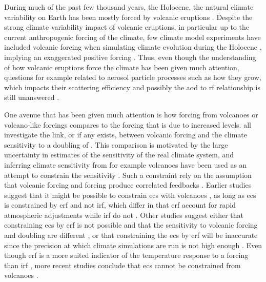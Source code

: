 \documentclass{ametsocV5}
\begin{document}
During much of the past few thousand years, the Holocene, the natural climate
variability on Earth has been mostly forced by volcanic eruptions \citep{sigl2022}.
Despite the strong climate variability impact of volcanic eruptions, in particular up to
the current anthropogenic forcing of the climate, few climate model experiments have
included volcanic forcing when simulating climate evolution during the Holocene
\citep{sigl2022}, implying an exaggerated positive forcing \citep{gregory2016}. Thus,
even though the understanding of how volcanic eruptions force the climate has been given
much attention, questions for example related to aerosol particle processes such as how
they grow, which impacts their scattering efficiency and possibly the \ac{aod} to
\ac{rf} relationship is still unanswered
\citep[e.g.][]{robock2000,zanchettin2019,marshall2020,marshall2022}.




One avenue that has been given much attention is how forcing from volcanoes or
volcano-like forcings compares to the forcing that is due to increased  levels.
\citet{boer2007,marvel2016,merlis2014,ollila2016,richardson2019,salvi2022,wigley2005}
all investigate the link, or if any exists, between volcanic forcing and the climate
sensitivity to a doubling of . This comparison is motivated by the large
uncertainty in estimates of the sensitivity of the real climate system, and inferring
climate sensitivity from for example volcanoes have been used as an attempt to constrain
the sensitivity \citep{boer2007}. Such a constraint rely on the assumption that volcanic
forcing and  forcing produce correlated feedbacks \citep{pauling2023}. Earlier
studies suggest that it might be possible to constrain \ac{ecs} with volcanoes
\citep{bender2010}, as long as \ac{ecs} is constrained by \ac{erf} and not \ac{irf},
which differ in that \ac{erf} account for rapid atmospheric adjustments while \ac{irf}
do not \citep{richardson2019}. Other studies suggest either that constraining \ac{ecs}
by \ac{erf} is not possible and that the sensitivity to volcanic forcing and 
doubling are different \citep{douglass2006}, or that constraining the \ac{ecs} by
\ac{erf} will be inaccurate since the precision at which climate simulations are run is
not high enough \citep{boer2007,salvi2022}. Even though \ac{erf} is a more suited
indicator of the temperature response to a forcing than \ac{irf}
\citep{marvel2016,richardson2019}, more recent studies conclude that \ac{ecs} cannot be
constrained from volcanoes \citep{pauling2023}.
\end{document}
